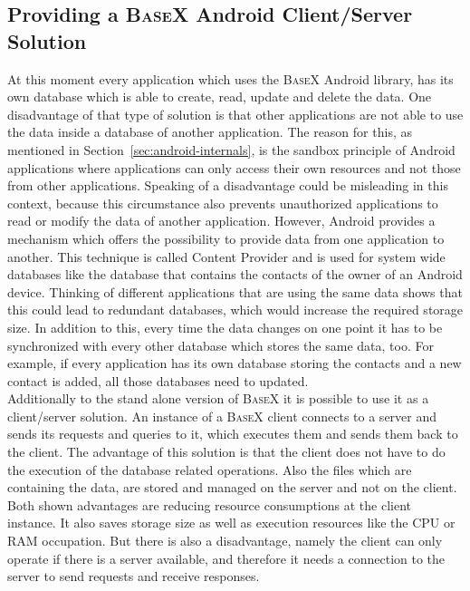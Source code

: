 \subsection{Providing a \textsc{BaseX} Android Client/Server Solution}
\label{sec:migration:providing-a-server-client-solution}
At this moment every application which uses the \textsc{BaseX} Android library, has its own database which is able to create, read, update and delete the data.
One disadvantage of that type of solution is that other applications are not able to use the data inside a database of another application.
The reason for this, as mentioned in Section~\ref{sec:android-internals}, is the sandbox principle of Android applications where applications can only access their own resources and not those from other applications.
Speaking of a disadvantage could be misleading in this context, because this circumstance also prevents unauthorized applications to read or modify the data of another application.
However, Android provides a mechanism which offers the possibility to provide data from one application to another.
This technique is called Content Provider and is used for system wide databases like the database that contains the contacts of the owner of an Android device.
Thinking of different applications that are using the same data shows that this could lead to redundant databases, which would increase the required storage size.
In addition to this, every time the data changes on one point it has to be synchronized with every other database which stores the same data, too.
For example, if every application has its own database storing the contacts and a new contact is added, all those databases need to updated.\\
Additionally to the stand alone version of \textsc{BaseX} it is possible to use it as a client/server solution.
An instance of a \textsc{BaseX} client connects to a server and sends its requests and queries to it, which executes them and sends them back to the client.
The advantage of this solution is that the client does not have to do the execution of the database related operations.
Also the files which are containing the data, are stored and managed on the server and not on the client.
Both shown advantages are reducing resource consumptions at the client instance.
It also saves storage size as well as execution resources like the CPU or RAM occupation.
But there is also a disadvantage, namely the client can only operate if there is a server available, and therefore it needs a connection to the server to send requests and receive responses.\\
